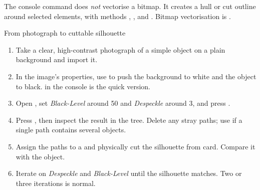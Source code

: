 \begin{notebox}
The console command  does \emph{not} vectorise a
bitmap. It creates a hull or cut outline around selected elements, with methods
, ,  and . Bitmap vectorisation is
.
\end{notebox}

\begin{tryit}{From photograph to cuttable silhouette}
\begin{enumerate}[label=\arabic*.,leftmargin=1.4em]
  \item Take a clear, high-contrast photograph of a simple object on a plain
        background and import it.
  \item In the image's properties, use  to push the background to
        white and the object to black.  in the console is
        the quick version.
  \item Open , set \emph{Black-Level} around 50 and
        \emph{Despeckle} around 3, and press .
  \item Press , then inspect the result in the tree. Delete any
        stray paths; use  if a single path contains several
        objects.
  \item Assign the paths to a  and physically cut the silhouette
        from card. Compare it with the object.
  \item Iterate on \emph{Despeckle} and \emph{Black-Level} until the silhouette
        matches. Two or three iterations is normal.
\end{enumerate}
\end{tryit}
